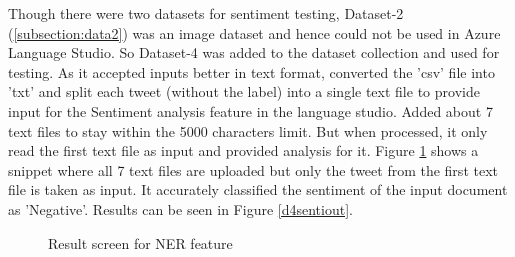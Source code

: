 \begin{itemize}
    Though there were two datasets for sentiment testing, Dataset-2 (\ref{subsection:data2}) was an image dataset and hence could not be used in Azure Language Studio. So Dataset-4 was added to the dataset collection and used for testing. As it accepted inputs better in text format, converted the 'csv' file into 'txt' and split each tweet (without the label) into a single text file to provide input for the Sentiment analysis feature in the language studio. Added about 7 text files to stay within the 5000 characters limit. But when processed, it only read the first text file as input and provided analysis for it. Figure \ref{d4sentiin} shows a snippet where all 7 text files are uploaded but only the tweet from the first text file is taken as input. It accurately classified the sentiment of the input document as 'Negative'. Results can be seen in Figure \ref{d4sentiout}.
    \begin {figure}[h!h]
        \centering
        \caption{Result screen for \acs{NER} feature}
        \label{d4sentiin}
    \end {figure}
    \begin {figure}[h!h]

\end{figure}
\end{itemize}
